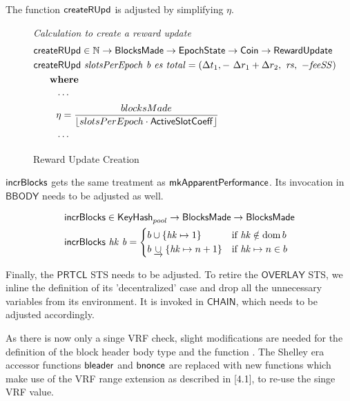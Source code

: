 The function $\mathsf{createRUpd}$ is adjusted by simplifying $\eta$.

\begin{figure}[htb]
  \emph{Calculation to create a reward update}
  \begin{align*}
    & \mathsf{createRUpd} \in \mathbb{N} \to \mathsf{BlocksMade} \to \mathsf{EpochState} \to \mathsf{Coin} \to \mathsf{RewardUpdate} \\
    & \mathsf{createRUpd}~\mathit{slotsPerEpoch}~\mathit{b}~\mathit{es}~\mathit{total} = \left(
      \Delta t_1,-~\Delta r_1+\Delta r_2,~\mathit{rs},~-\mathit{feeSS}\right) \\
    & ~~~~ ~ \mathbf{where}~ ~  \\
    & ~~~~~~~\dotsb \\
    & ~~~~~~~\eta =
        \frac{blocksMade}{\lfloor{slotsPerEpoch} \cdot \mathsf{ActiveSlotCoeff}\rfloor} \\
    & ~~~~~~~\dotsb
  \end{align*}

  \caption{Reward Update Creation}
  \label{fig:functions:reward-update-creation}
\end{figure}

$\mathsf{incrBlocks}$ gets the same treatment as $\mathsf{mkApparentPerformance}$. Its invocation in $\mathsf{BBODY}$ needs to be adjusted as well.

\begin{figure}
  \begin{align*}
      & \mathsf{incrBlocks} \in \mathsf{KeyHash}_{pool} \to
          \mathsf{BlocksMade} \to \mathsf{BlocksMade} \\
      & \mathsf{incrBlocks}~\mathit{hk}~\mathit{b} =
        \begin{cases}
          b\cup\{\mathit{hk}\mapsto 1\} & \text{if }\mathit{hk}\notin\operatorname{dom}{b} \\
          b\mathbin{\underrightarrow\cup}\{\mathit{hk}\mapsto n+1\} & \text{if }\mathit{hk}\mapsto n\in b \\
        \end{cases}
  \end{align*}
\end{figure}

\newpage
Finally, the $\mathsf{PRTCL}$ STS needs to be adjusted.
To retire the $\mathsf{OVERLAY}$ STS, we inline the definition of its
'decentralized' case and drop all the unnecessary variables from its environment.
It is invoked in $\mathsf{CHAIN}$, which needs to be adjusted accordingly.

As there is now only a singe VRF check, slight modifications are needed for the
definition of the block header body  type and the function .
The Shelley era accessor functions $\mathsf{bleader}$ and $\mathsf{bnonce}$ are replaced with new functions
which make use of the VRF range extension as described in \cite{vrf-range-extension}[4.1],
to re-use the singe VRF value.

